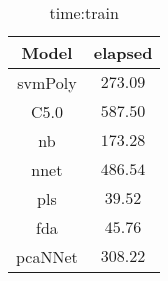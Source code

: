 \begin{table}[!ht]
	\centering
	\begin{tabular}{|c|c|}
		\hline
		Model & elapsed \\ \hline
		svmPoly & $273.09$ \\ \hline
		C5.0 & $587.50$ \\ \hline
		nb & $173.28$ \\ \hline
		nnet & $486.54$ \\ \hline
		pls & $39.52$ \\ \hline
		fda & $45.76$ \\ \hline
		pcaNNet & $308.22$ \\ \hline
	\end{tabular}
	\caption{time:train}
	\label{tab:time:train}
\end{table}
